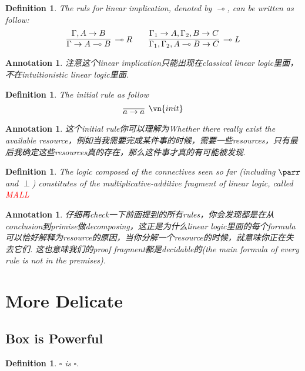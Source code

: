 \documentclass{article}
\theoremstyle{plain}
\newtheorem{definition}[theorem]{Definition}
\newtheorem{annotation}[theorem]{Annotation}
\theoremstyle{nonumberplain}
\newcommand{\redt}[1]{\textcolor{red}{#1}}
\begin{document}
\begin{definition}
\rm The ruls for linear implication, denoted by $\multimap$, can be written as follow:
\[
	\infer[\multimap R]{\Gamma \to A \multimap B}{\Gamma, A \to B}\quad\quad \infer[\multimap L]{\Gamma_1, \Gamma_2, A \multimap B \to C}{\Gamma_1 \to A, \Gamma_2, B\to C}
\]
\end{definition}

\begin{annotation}
\rm 注意这个linear implication只能出现在classical linear logic里面，不在intuitionistic linear logic里面.
\end{annotation}

\begin{definition}
\rm The initial rule as follow
\[
\infer[\vn{init}]{a \to a}{}
\]
\end{definition}

\begin{annotation}
\rm 这个initial rule你可以理解为Whether there really exist the available resource，例如当我需要完成某件事的时候，需要一些resources，只有最后我确定这些resources真的存在，那么这件事才真的有可能被发现.
\end{annotation}

\begin{definition}
\rm The logic composed of the connectives seen so far (including $\parr$ and $\perp$) constitutes of the multiplicative-additive fragment of linear logic, called \redt{MALL} 
\end{definition}


\begin{annotation}
\rm 仔细再check一下前面提到的所有rules，你会发现都是在从conclusion到primise做decomposing，这正是为什么linear logic里面的每个formula可以恰好解释为resource的原因，当你分解一个resource的时候，就意味你正在失去它们. 这也意味我们的proof fragment都是decidable的(the main formula of every rule is not in the premises). 
\end{annotation}


\newpage
\section{More Delicate}
\subsection{Box is Powerful}

\begin{definition}
\rm $\square$ is $\square$. 
\end{definition}
\end{document}
